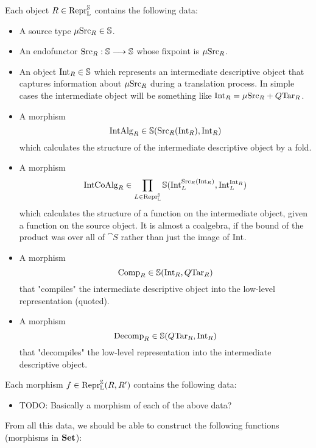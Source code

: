 Each object $R \in \mathrm{Repr} _{\mathbb L} ^{\mathbb S}$ contains the following data:
\begin{itemize}
  \item A source type $\mathrm \mu \mathrm {Src} _R \in \mathbb S$.
  \item An endofunctor $\mathrm {Src} _R : \mathbb S \longrightarrow \mathbb S$ whose fixpoint is $\mu
          \mathrm {Src} _R$.
  \item An object $\mathrm {Int}_R \in \mathbb S$ which represents an intermediate
        descriptive object that captures information about $\mu \mathrm {Src} _R$ during a
        translation process. In simple cases the intermediate object will be something
        like $\mathrm {Int}_R = \mu \mathrm {Src} _R + Q \mathrm {Tar}_R$.
  \item A morphism $$\mathrm {IntAlg} _R \in \mathbb S (\mathrm {Src}_R (\mathrm {Int}_R), \mathrm
          {Int}_R)$$ which calculates the structure of the intermediate descriptive
        object by a fold.
  \item A morphism $$\mathrm {IntCoAlg} _R \in \prod _{L \in \mathrm{Repr} _{\mathbb L} ^{\mathbb S}}
          \mathbb S ( \mathrm {Int}_L ^{\mathrm {Src}_R (\mathrm {Int}_R)}, \mathrm {Int}_L ^{\mathrm
          {Int}_R})$$ which calculates the structure of a function on the intermediate
        object, given a function on the source object. It is almost a coalgebra, if the
        bound of the product was over all of $\cat S$ rather than just the image of
        $\mathrm {Int}$.
  \item A morphism $$\mathrm {Comp} _R \in \mathbb S (\mathrm {Int}_R , Q \mathrm {Tar}_R)$$ that
        "compiles" the intermediate descriptive object into the low-level
        representation (quoted).
  \item A morphism $$\mathrm {Decomp} _R \in \mathbb S (Q \mathrm {Tar}_R, \mathrm {Int}_R)$$ that
        "decompiles" the low-level representation into the intermediate descriptive
        object.
\end{itemize}

Each morphism $f \in \mathrm{Repr} _{\mathbb L} ^{\mathbb S} (R, R')$ contains the following
data:
\begin{itemize}
  \item TODO: Basically a morphism of each of the above data?
\end{itemize}

From all this data, we should be able to construct the following functions
(morphisms in $\mathbf{Set}$):

